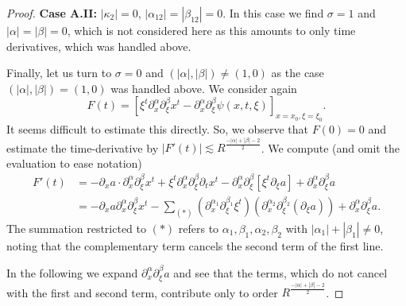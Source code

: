 \documentclass{amsart}
\theoremstyle{definition}
\begin{document}
\begin{proof}
\textbf{Case A.II:} $|\kappa_2| = 0$, $|\alpha_{12}| = |\beta_{12}| = 0$. In this case we find $\sigma = 1$ and $|\alpha| = |\beta| = 0$, which is not considered here as this amounts to only time derivatives, which was handled above.
%
\smallskip

Finally, let us turn to $\sigma = 0$ and $(|\alpha|,|\beta|) \neq (1,0)$ as the case $(|\alpha|,|\beta|) = (1,0)$ was handled above.
We consider again
\begin{equation*}
F(t) = [ \xi^t \partial_x^{\alpha} \partial_{\xi}^{\beta} x^t - \partial_x^{\alpha} \partial_{\xi}^{\beta} \psi(x,t,\xi) ]_{x=x_0,\xi = \xi_0}.
\end{equation*}
It seems difficult to estimate this directly. So, we observe that $F(0)= 0$ and estimate the time-derivative by $|F'(t)| \lesssim R^{\frac{-|\alpha|+|\beta|-2}{2}}$.
We compute (and omit the evaluation to ease notation)
\begin{equation}
\label{eq:FPrime}
\begin{split}
F'(t) &= - \partial_x a \cdot \partial_x^{\alpha} \partial_{\xi}^{\beta} x^t + \xi^t \partial_x^{\alpha} \partial_{\xi}^{\beta} \partial_t x^t - \partial_x^{\alpha} \partial_{\xi}^{\beta} [ \xi^t \partial_{\xi} a] + \partial_x^{\alpha} \partial_{\xi}^{\beta} a \\
&= - \partial_x a \partial_x^{\alpha} \partial_{\xi}^{\beta} x^t - \sum_{(*)} (\partial_x^{\alpha_1} \partial_{\xi}^{\beta_1} \xi^t) (\partial_x^{\alpha_2} \partial_{\xi}^{\beta_2} (\partial_{\xi} a)) + \partial_x^{\alpha} \partial_{\xi}^{\beta} a.
\end{split}
\end{equation}
The summation restricted to $(*)$ refers to $\alpha_1,\beta_1,\alpha_2,\beta_2$ with $|\alpha_1|+|\beta_1| \neq 0$, noting that the complementary term cancels the second term of the first line.

In the following we expand $\partial_x^{\alpha} \partial_{\xi}^{\beta} a$ and see that the terms, which do not cancel with the first and second term, contribute only to order $R^{\frac{-|\alpha|+|\beta|-2}{2}}$.


\end{proof}
\end{document}
